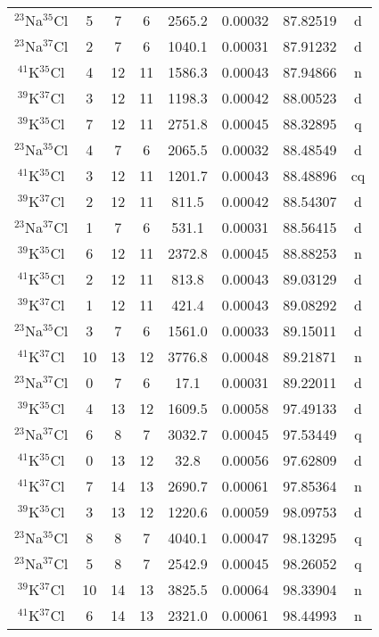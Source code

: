 \begin{table*}[htp]
\begin{tabular}{cccccccc}
$^{23}$Na$^{35}$Cl & 5 & 7 & 6 & 2565.2 & 0.00032 & 87.82519 & d \\
$^{23}$Na$^{37}$Cl & 2 & 7 & 6 & 1040.1 & 0.00031 & 87.91232 & d \\
$^{41}$K$^{35}$Cl & 4 & 12 & 11 & 1586.3 & 0.00043 & 87.94866 & n \\
$^{39}$K$^{37}$Cl & 3 & 12 & 11 & 1198.3 & 0.00042 & 88.00523 & d \\
$^{39}$K$^{35}$Cl & 7 & 12 & 11 & 2751.8 & 0.00045 & 88.32895 & q \\
$^{23}$Na$^{35}$Cl & 4 & 7 & 6 & 2065.5 & 0.00032 & 88.48549 & d \\
$^{41}$K$^{35}$Cl & 3 & 12 & 11 & 1201.7 & 0.00043 & 88.48896 & cq \\
$^{39}$K$^{37}$Cl & 2 & 12 & 11 & 811.5 & 0.00042 & 88.54307 & d \\
$^{23}$Na$^{37}$Cl & 1 & 7 & 6 & 531.1 & 0.00031 & 88.56415 & d \\
$^{39}$K$^{35}$Cl & 6 & 12 & 11 & 2372.8 & 0.00045 & 88.88253 & n \\
$^{41}$K$^{35}$Cl & 2 & 12 & 11 & 813.8 & 0.00043 & 89.03129 & d \\
$^{39}$K$^{37}$Cl & 1 & 12 & 11 & 421.4 & 0.00043 & 89.08292 & d \\
$^{23}$Na$^{35}$Cl & 3 & 7 & 6 & 1561.0 & 0.00033 & 89.15011 & d \\
$^{41}$K$^{37}$Cl & 10 & 13 & 12 & 3776.8 & 0.00048 & 89.21871 & n \\
$^{23}$Na$^{37}$Cl & 0 & 7 & 6 & 17.1 & 0.00031 & 89.22011 & d \\
$^{39}$K$^{35}$Cl & 4 & 13 & 12 & 1609.5 & 0.00058 & 97.49133 & d \\
$^{23}$Na$^{37}$Cl & 6 & 8 & 7 & 3032.7 & 0.00045 & 97.53449 & q \\
$^{41}$K$^{35}$Cl & 0 & 13 & 12 & 32.8 & 0.00056 & 97.62809 & d \\
$^{41}$K$^{37}$Cl & 7 & 14 & 13 & 2690.7 & 0.00061 & 97.85364 & n \\
$^{39}$K$^{35}$Cl & 3 & 13 & 12 & 1220.6 & 0.00059 & 98.09753 & d \\
$^{23}$Na$^{35}$Cl & 8 & 8 & 7 & 4040.1 & 0.00047 & 98.13295 & q \\
$^{23}$Na$^{37}$Cl & 5 & 8 & 7 & 2542.9 & 0.00045 & 98.26052 & q \\
$^{39}$K$^{37}$Cl & 10 & 14 & 13 & 3825.5 & 0.00064 & 98.33904 & n \\
$^{41}$K$^{37}$Cl & 6 & 14 & 13 & 2321.0 & 0.00061 & 98.44993 & n \\

\end{tabular}
\end{table*}
